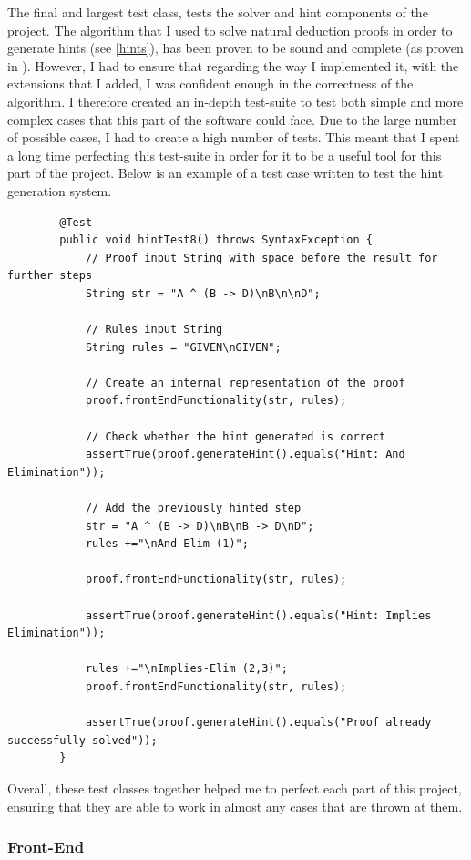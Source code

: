 The final and largest test class, tests the solver and hint components of the project. The algorithm that I used to solve natural deduction proofs in order to generate hints (see \ref{hints}), has been proven to be sound and complete (as proven in \cite{ndAlgo}). However, I had to ensure that regarding the way I implemented it, with the extensions that I added, I was confident enough in the correctness of the algorithm. I therefore created an in-depth test-suite to test both simple and more complex cases that this part of the software could face. Due to the large number of possible cases, I had to create a high number of tests. This meant that I spent a long time perfecting this test-suite in order for it to be a useful tool for this part of the project. Below is an example of a test case written to test the hint generation system. 
\pagebreak
	\begin{lstlisting}
		@Test
		public void hintTest8() throws SyntaxException {
			// Proof input String with space before the result for further steps
			String str = "A ^ (B -> D)\nB\n\nD";
			
			// Rules input String
			String rules = "GIVEN\nGIVEN";

			// Create an internal representation of the proof
			proof.frontEndFunctionality(str, rules);

			// Check whether the hint generated is correct
			assertTrue(proof.generateHint().equals("Hint: And Elimination"));

			// Add the previously hinted step
			str = "A ^ (B -> D)\nB\nB -> D\nD";
			rules +="\nAnd-Elim (1)";
			
			proof.frontEndFunctionality(str, rules);

			assertTrue(proof.generateHint().equals("Hint: Implies Elimination"));
		
			rules +="\nImplies-Elim (2,3)";
			proof.frontEndFunctionality(str, rules);

			assertTrue(proof.generateHint().equals("Proof already successfully solved"));
		}
\end{lstlisting}

Overall, these test classes together helped me to perfect each part of this project, ensuring that they are able to work in almost any cases that are thrown at them.

\subsubsection{Front-End}

